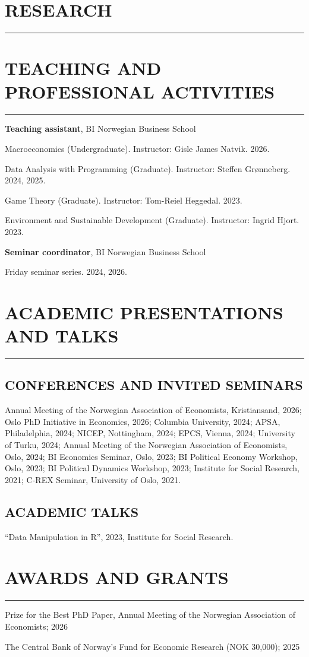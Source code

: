 \documentclass{article}
\newcommand{\cvsection}[1]{\section*{\normalfont#1} \vspace{-0.15cm}\hrule \hspace{1.6em}}
\newcommand{\cvsubsection}[1]{\vspace{-0.5cm}\subsection*{\normalfont#1}}
\begin{document}
\cvsection{RESEARCH}


\newpage
\cvsection{TEACHING AND PROFESSIONAL ACTIVITIES}

\noindent
\hspace{0.4em}
\textbf{Teaching assistant}, BI Norwegian Business School

Macroeconomics (Undergraduate). Instructor: Gisle James Natvik. 2026.

Data Analysis with Programming (Graduate). Instructor: Steffen Grønneberg. 2024, 2025.

Game Theory (Graduate). Instructor: Tom-Reiel Heggedal. 2023.

Environment and Sustainable Development (Graduate). Instructor: Ingrid Hjort. 2023.

\noindent
\hspace{0.4em}
\textbf{Seminar coordinator}, BI Norwegian Business School

Friday seminar series. 2024, 2026.


\cvsection{ACADEMIC PRESENTATIONS AND TALKS}
\cvsubsection{CONFERENCES AND INVITED SEMINARS}

\noindent
\hfill\begin{minipage}{\dimexpr\textwidth-0.4em}
Annual Meeting of the Norwegian Association of Economists, Kristiansand, 2026; Oslo PhD Initiative in Economics, 2026; Columbia University, 2024; APSA, Philadelphia, 2024; NICEP, Nottingham, 2024; EPCS, Vienna, 2024; University of Turku, 2024; Annual Meeting of the Norwegian Association of Economists, Oslo, 2024; BI Economics Seminar, Oslo, 2023; BI Political Economy Workshop, Oslo, 2023; BI Political Dynamics Workshop, 2023; Institute for Social Research, 2021; C-REX Seminar, University of Oslo, 2021.
\end{minipage}

\vspace{1em}
\cvsubsection{ACADEMIC TALKS}

\noindent
\hspace{0.4em}
``Data Manipulation in R'', 2023, Institute for Social Research.

\cvsection{AWARDS AND GRANTS}

\noindent
\hspace{0.4em}
Prize for the Best PhD Paper, Annual Meeting of the Norwegian Association of Economists; 2026

\noindent
\hspace{0.4em}
The Central Bank of Norway's Fund for Economic Research (NOK 30,000); 2025
\end{document}
